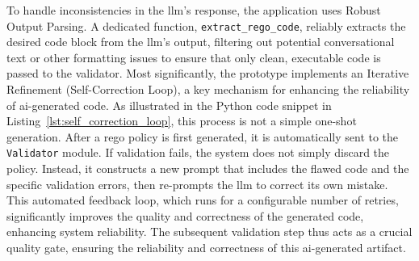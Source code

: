 To handle inconsistencies in the \gls{llm}'s response, the application uses Robust Output Parsing. A dedicated function, \texttt{extract\_rego\_code}, reliably extracts the desired code block from the \gls{llm}'s output, filtering out potential conversational text or other formatting issues to ensure that only clean, executable code is passed to the validator.
Most significantly, the prototype implements an Iterative Refinement (Self-Correction Loop), a key mechanism for enhancing the reliability of \gls{ai}-generated code. As illustrated in the Python code snippet in Listing~\ref{lst:self_correction_loop}, this process is not a simple one-shot generation. After a \gls{rego} policy is first generated, it is automatically sent to the \texttt{Validator} module. If validation fails, the system does not simply discard the policy. Instead, it constructs a new prompt that includes the flawed code and the specific validation errors, then re-prompts the \gls{llm} to correct its own mistake. This automated feedback loop, which runs for a configurable number of retries, significantly improves the quality and correctness of the generated code, enhancing system reliability. The subsequent validation step thus acts as a crucial quality gate, ensuring the reliability and correctness of this \gls{ai}-generated artifact.
